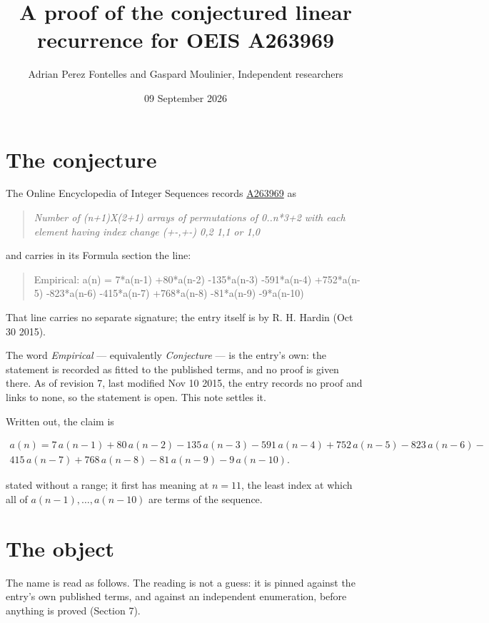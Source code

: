 \documentclass[11pt]{article}
\title{A proof of the conjectured linear recurrence for OEIS A263969}
\author{Adrian Perez Fontelles and Gaspard Moulinier, Independent researchers}
\date{09 September 2026}
\theoremstyle{definition}
\begin{document}
\maketitle
\section{The conjecture}

The Online Encyclopedia of Integer Sequences records \href{https://oeis.org/A263969}{A263969} as

\begin{quote}\itshape Number of (n+1)X(2+1) arrays of permutations of 0..n*3+2 with each element having index change (+-,+-) 0,2 1,1 or 1,0\end{quote}

and carries in its Formula section the line:

\begin{quote}\ttfamily Empirical: a(n) = 7*a(n-1) +80*a(n-2) -135*a(n-3) -591*a(n-4) +752*a(n-5) -823*a(n-6) -415*a(n-7) +768*a(n-8) -81*a(n-9) -9*a(n-10)\end{quote}

That line carries no separate signature; the entry itself is by R. H. Hardin (Oct 30 2015).

The word {\itshape Empirical} --- equivalently {\itshape Conjecture} --- is the entry's own: the statement is recorded as fitted to the published terms, and no proof is given there. As of revision 7, last modified Nov 10 2015, the entry records no proof and links to none, so the statement is open. This note settles it.

Written out, the claim is

\begin{multline*} a(n) = 7\,a(n-1) + 80\,a(n-2) - 135\,a(n-3) - 591\,a(n-4) + 752\,a(n-5) - 823\,a(n-6) - \\ 415\,a(n-7) + 768\,a(n-8) - 81\,a(n-9) - 9\,a(n-10). \end{multline*}

stated without a range; it first has meaning at $n = 11$, the least index at which all of $a(n-1),\dots,a(n-10)$ are terms of the sequence.

\section{The object}

The name is read as follows. The reading is not a guess: it is pinned against the entry's own published terms, and against an independent enumeration, before anything is proved (Section 7).
\end{document}

